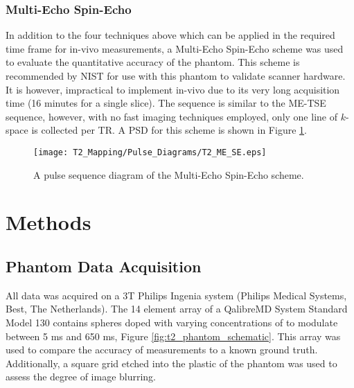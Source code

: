\subsubsection{Multi-Echo Spin-Echo}
In addition to the four techniques above which can be applied in the required time frame for in-vivo measurements, a Multi-Echo Spin-Echo scheme was used to evaluate the quantitative accuracy of the phantom. This scheme is recommended by \ac{NIST} for use with this phantom to validate scanner hardware. It is however, impractical to implement in-vivo due to its very long acquisition time (16 minutes for a single slice). The sequence is similar to the \ac{ME-TSE} sequence, however, with no fast imaging techniques employed, only one line of $k$-space is collected per \ac{TR}. A \ac{PSD} for this scheme is shown in Figure \ref{fig:t2_me-se_seq}.

\begin{figure}[H]
	\centering
	\texttt{[image: T2\_Mapping/Pulse\_Diagrams/T2\_ME\_SE.eps]}
	\caption{A pulse sequence diagram of the Multi-Echo Spin-Echo scheme.}
	\label{fig:t2_me-se_seq}	
\end{figure}

\newpage

\section{Methods}
\label{sec:t2_methods}

\subsection{Phantom Data Acquisition}

All data was acquired on a 3T Philips Ingenia system (Philips Medical Systems, Best, The Netherlands). The 14 element \ttwo array of a QalibreMD System Standard Model 130 contains spheres doped with varying concentrations of  to modulate \ttwo between 5 ms and 650 ms, Figure \ref{fig:t2_phantom_schematic}. This array was used to compare the accuracy of \ttwo measurements to a known ground truth. Additionally, a square grid etched into the plastic of the phantom was used to assess the degree of image blurring. 

